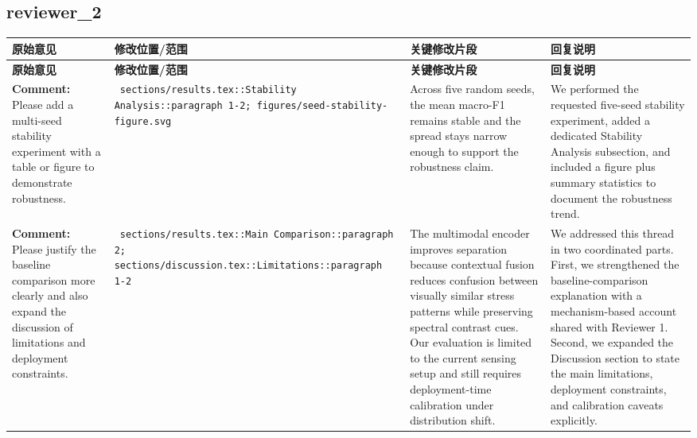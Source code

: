 \documentclass[11pt]{article}
\begin{document}
\subsection*{ reviewer\_2 }
\begin{longtable}{|p{}|p{}|p{}|p{}|}
\hline
\textbf{原始意见} & \textbf{修改位置/范围} & \textbf{关键修改片段} & \textbf{回复说明} \\
\hline
\endfirsthead
\hline
\textbf{原始意见} & \textbf{修改位置/范围} & \textbf{关键修改片段} & \textbf{回复说明} \\
\hline
\endhead
\textbf{Comment:} Please add a multi-seed stability experiment with a table or figure to demonstrate robustness. & \texttt{ sections/results.tex::Stability Analysis::paragraph 1-2; figures/seed-stability-figure.svg } & {\color{blue}\ttfamily Across five random seeds, the mean macro-F1 remains stable and the spread stays narrow enough to support the robustness claim.} & We performed the requested five-seed stability experiment, added a dedicated Stability Analysis subsection, and included a figure plus summary statistics to document the robustness trend. \\
\hline
\textbf{Comment:} Please justify the baseline comparison more clearly and also expand the discussion of limitations and deployment constraints. & \texttt{ sections/results.tex::Main Comparison::paragraph 2; sections/discussion.tex::Limitations::paragraph 1-2 } & {\color{blue}\ttfamily The multimodal encoder improves separation because contextual fusion reduces confusion between visually similar stress patterns while preserving spectral contrast cues. Our evaluation is limited to the current sensing setup and still requires deployment-time calibration under distribution shift.} & We addressed this thread in two coordinated parts. First, we strengthened the baseline-comparison explanation with a mechanism-based account shared with Reviewer 1. Second, we expanded the Discussion section to state the main limitations, deployment constraints, and calibration caveats explicitly. \\
\hline
\end{longtable}
\end{document}
